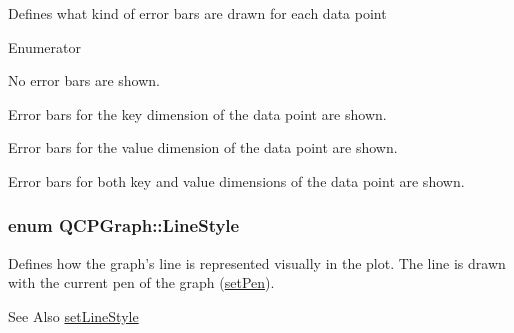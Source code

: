 Defines what kind of error bars are drawn for each data point \begin{Desc}
\item[Enumerator]\par
\begin{description}
\item[{\em 
\hypertarget{classQCPGraph_ad23b514404bd2cb3216f57c90904d6afaeae745e7cc1766bb8546e35d4b76a711}{et\-None}\label{classQCPGraph_ad23b514404bd2cb3216f57c90904d6afaeae745e7cc1766bb8546e35d4b76a711}
}]No error bars are shown. \item[{\em 
\hypertarget{classQCPGraph_ad23b514404bd2cb3216f57c90904d6afa2a5d89cd76fb8b6b18d71b8f6f6c0f43}{et\-Key}\label{classQCPGraph_ad23b514404bd2cb3216f57c90904d6afa2a5d89cd76fb8b6b18d71b8f6f6c0f43}
}]Error bars for the key dimension of the data point are shown. \item[{\em 
\hypertarget{classQCPGraph_ad23b514404bd2cb3216f57c90904d6afa147022ccdc49f6bd48f904cb4f61872e}{et\-Value}\label{classQCPGraph_ad23b514404bd2cb3216f57c90904d6afa147022ccdc49f6bd48f904cb4f61872e}
}]Error bars for the value dimension of the data point are shown. \item[{\em 
\hypertarget{classQCPGraph_ad23b514404bd2cb3216f57c90904d6afa761cb7d61670c1e2efecccd8974409ab}{et\-Both}\label{classQCPGraph_ad23b514404bd2cb3216f57c90904d6afa761cb7d61670c1e2efecccd8974409ab}
}]Error bars for both key and value dimensions of the data point are shown. \end{description}
\end{Desc}
\hypertarget{classQCPGraph_ad60175cd9b5cac937c5ee685c32c0859}{
\subsubsection[{Line\-Style}]{\setlength{\rightskip}{0pt plus 5cm}enum {\bf Q\-C\-P\-Graph\-::\-Line\-Style}}}\label{classQCPGraph_ad60175cd9b5cac937c5ee685c32c0859}
Defines how the graph's line is represented visually in the plot. The line is drawn with the current pen of the graph (\hyperlink{classQCPAbstractPlottable_ab74b09ae4c0e7e13142fe4b5bf46cac7}{set\-Pen}). \begin{DoxySeeAlso}{See Also}
\hyperlink{classQCPGraph_a513fecccff5b2a50ce53f665338c60ff}{set\-Line\-Style} 
\end{DoxySeeAlso}
